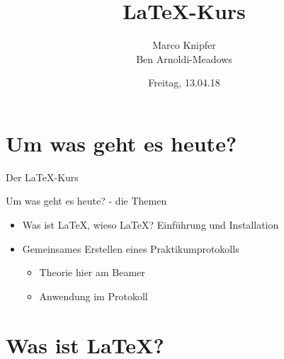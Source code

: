 \documentclass[hyperref={pdfpagelabels=false}]{beamer}
\title[\LaTeX-Einführung]{\LaTeX-Kurs}
\institute[]{Fachschaft Physik, Uni Frankfurt}
\author[Marco, Ben]{Marco Knipfer \\ Ben Arnoldi-Meadows}
\date{Freitag, 13.04.18}
\begin{document}
 
\begin{frame}[plain]
    \maketitle
\end{frame}
\begin{frame}[plain]
    \tableofcontents
\end{frame}
\section{Um was geht es heute?}
\begin{frame}{Der \LaTeX{}-Kurs}
    \begin{block}{Um was geht es heute? - die Themen}
        \begin{itemize}
            \item Was ist \LaTeX{}, wieso \LaTeX{}? Einführung und Installation
            \item Gemeinsames Erstellen eines Praktikumprotokolls
                \begin{itemize}
                    \item Theorie hier am Beamer
                    \item Anwendung im Protokoll
                \end{itemize}
        \end{itemize}
    \end{block}
\end{frame}

\section{Was ist \LaTeX{}?}
\end{document}
